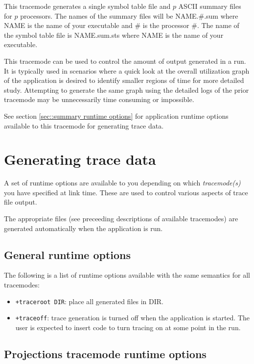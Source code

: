 \documentclass[10pt]{article}
\begin{document}
This tracemode generates a single symbol table file and $p$ ASCII
summary files for $p$ processors. The names of the summary files will
be NAME.\#.sum where NAME is the name of your executable and \# is the
processor \#. The name of the symbol table file is NAME.sum.sts where NAME
is the name of your executable.

This tracemode can be used to control the amount of output generated
in a run. It is typically used in scenarios where a quick look at the
overall utilization graph of the application is desired to identify
smaller regions of time for more detailed study. Attempting to
generate the same graph using the detailed logs of the prior tracemode
may be unnecessarily time consuming or impossible.

See section \ref{sec::summary runtime options} for application runtime
options available to this tracemode for generating trace data.

\section{Generating trace data}
\label{sec::trace generation}

A set of runtime options are available to you depending on which {\em
tracemode(s)} you have specified at link time. These are used to
control various aspects of trace file output.

The appropriate files (see preceeding descriptions of available
tracemodes) are generated automatically when the application is run.

\subsection{General runtime options}
\label{sec::general options}

The following is a list of runtime options available with the same
semantics for all tracemodes:

\begin{itemize}
\item
{\tt +traceroot DIR}: place all generated files in DIR.
\item
{\tt +traceoff}:      trace generation is turned off when the application is started. The user is expected to insert code to turn tracing on at some point in the run.
\end{itemize}

\subsection{Projections tracemode runtime options}
\label{sec::projections runtime options}
\end{document}
